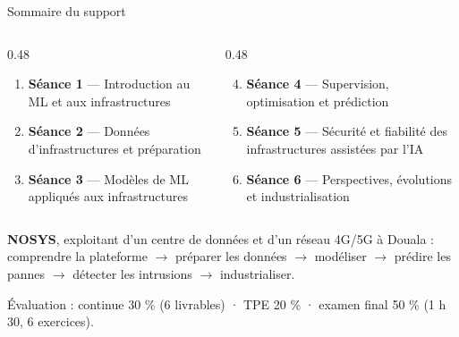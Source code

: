 \begin{frame}{Sommaire du support}
\begin{columns}[t]
\begin{column}{0.48\textwidth}
\begin{enumerate}
\item \textbf{Séance 1} --- Introduction au ML et aux infrastructures
\item \textbf{Séance 2} --- Données d'infrastructures et préparation
\item \textbf{Séance 3} --- Modèles de ML appliqués aux infrastructures
\end{enumerate}
\end{column}
\begin{column}{0.48\textwidth}
\begin{enumerate}\setcounter{enumi}{3}
\item \textbf{Séance 4} --- Supervision, optimisation et prédiction
\item \textbf{Séance 5} --- Sécurité et fiabilité des infrastructures assistées par l'IA
\item \textbf{Séance 6} --- Perspectives, évolutions et industrialisation
\end{enumerate}
\end{column}
\end{columns}
\vspace{2mm}
\begin{kbox}
\textbf{NOSYS}, exploitant d'un centre de données et d'un réseau 4G/5G à Douala :
comprendre la plateforme $\to$ préparer les données $\to$ modéliser $\to$
prédire les pannes $\to$ détecter les intrusions $\to$ industrialiser.
\end{kbox}
\begin{center}\small
Évaluation : continue 30 \% (6 livrables) · TPE 20 \% · examen final 50 \% (1 h 30, 6 exercices).
\end{center}
\end{frame}






























